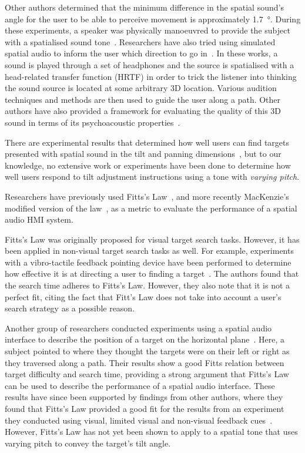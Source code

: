 \documentclass[format=sigconf, review=true, screen=true, anonymous=true]{acmart}
\begin{document}
Other authors determined that the minimum difference in the spatial sound's angle for the user to be able to perceive movement is approximately \SI{1.7}{\degree}. During these experiments, a speaker was physically manoeuvred to provide the subject with a spatialised sound tone~\cite{ashmead1998spatial}. Researchers have also tried using simulated spatial audio to inform the user which direction to go in~\cite{holland2002audiogps, kammoun2012navigation, rebillat2009smart, menelas2010audio, wilson2007swan}. In these works, a sound is played through a set of headphones and the source is spatialised with a head-related transfer function (HRTF) in order to trick the listener into thinking the sound source is located at some arbitrary 3D location. Various audition techniques and methods are then used to guide the user along a path. Other authors have also provided a framework for evaluating the quality of this 3D sound in terms of its psychoacoustic properties~\cite{guastavino2004perceptual, nicol2014roadmap}. 
	
There are experimental results that determined how well users can find targets presented with spatial sound in the tilt and panning dimensions~\cite{katz2011spatial, zwiers2001spatial}, but to our knowledge, no extensive work or experiments have been done to determine how well users respond to tilt adjustment instructions using a tone with \emph{varying pitch}. 

Researchers have previously used Fitts's Law~\cite{fitts1954information}, and more recently MacKenzie's modified version of the law~\cite{mackenzie1992fitts}, as a metric to evaluate the performance of a spatial audio HMI system. 

Fitts's Law was originally proposed for visual target search tasks. However, it has been applied in non-visual target search tasks as well. For example, experiments with a vibro-tactile feedback pointing device have been performed to determine how effective it is at directing a user to finding a target~\cite{ahmaniemi2009augmented}. The authors found that the search time adheres to Fitts's Law. However, they also note that it is not a perfect fit, citing the fact that Fitt's Law does not take into account a user's search strategy as a possible reason. 

Another group of researchers conducted experiments using a spatial audio interface to describe the position of a target on the horizontal plane~\cite{marentakis2006effects}. Here, a subject pointed to where they thought the targets were on their left or right as they traversed along a path. Their results show a good Fitts relation between target difficulty and search time, providing a strong argument that Fitts's Law can be used to describe the performance of a spatial audio interface. These results have since been supported by findings from other authors, where they found that Fitts's Law provided a good fit for the results from an experiment they conducted using visual, limited visual and non-visual feedback cues~\cite{wu2010fitts}. However, Fitts's Law has not yet been shown to apply to a spatial tone that uses varying pitch to convey the target's tilt angle.
\end{document}
